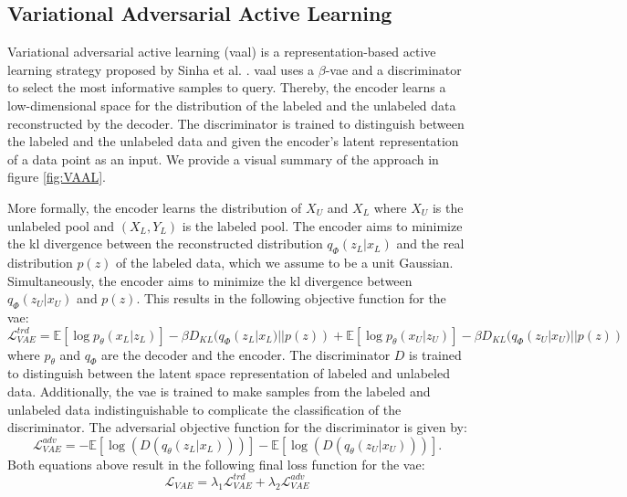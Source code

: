 \subsection{Variational Adversarial Active Learning}
\label{sec:Related_work:Active_Learning:VAAL}
Variational adversarial active learning (\gls{vaal}) is a representation-based active learning strategy proposed by Sinha et al. \cite{sinha2019variational}. 
\gls{vaal} uses a $\beta$-\gls{vae} \cite{higgins2017beta} and a discriminator to select the most informative samples to query.
Thereby, the encoder learns a low-dimensional space for the distribution of the labeled and the unlabeled data reconstructed by the decoder. 
The discriminator is trained to distinguish between the labeled and the unlabeled data and given the encoder's latent representation of a data point as an
input. We provide a visual summary of the approach in figure \ref{fig:VAAL}. \par
More formally, the encoder learns the distribution of $X_U$ and $X_L$ where $X_U$ is the unlabeled pool and $(X_L, Y_L)$ is the labeled pool. The encoder
aims to minimize the \gls{kl} divergence \cite{goldberger2004hierarchical} between the reconstructed distribution $q_\Phi (z_L | x_L)$ and
the real distribution $p(z)$ of the labeled data, which we assume to be a unit Gaussian. Simultaneously, the encoder aims to minimize the \gls{kl} divergence
between $q_\Phi (z_U | x_U)$ and $p(z)$. This results in the following objective function for the \gls{vae}:
\begin{equation}
    \mathcal{L}^{trd}_{VAE} = \mathbb{E}[\log p_\theta (x_L | z_L)] - \beta D_{KL} (q_\Phi (z_L | x_L) || p(z)) + \mathbb{E}[\log p_\theta (x_U | z_U)] - \beta D_{KL} (q_\Phi (z_U | x_U) || p(z))
\end{equation}
where $p_\theta$ and $q_\Phi$ are the decoder and the encoder. The discriminator $D$ is trained to distinguish between the latent space representation
of labeled and unlabeled data. Additionally, the \gls{vae} is trained to make samples from the labeled and
unlabeled data indistinguishable to complicate the classification of the discriminator. The adversarial objective function for the discriminator is given by:
\begin{equation}
    \mathcal{L}^{adv}_{VAE} = - \mathbb{E}[\log(D(q_\theta (z_L | x_L)))] - \mathbb{E}[\log(D(q_\theta(z_U | x_U)))].
\end{equation}
Both equations above result in the following final loss function for the \gls{vae}:
\begin{equation}
    \mathcal{L}_{VAE} = \lambda_1 \mathcal{L}^{trd}_{VAE} + \lambda_2 \mathcal{L}^{adv}_{VAE}
\end{equation}
